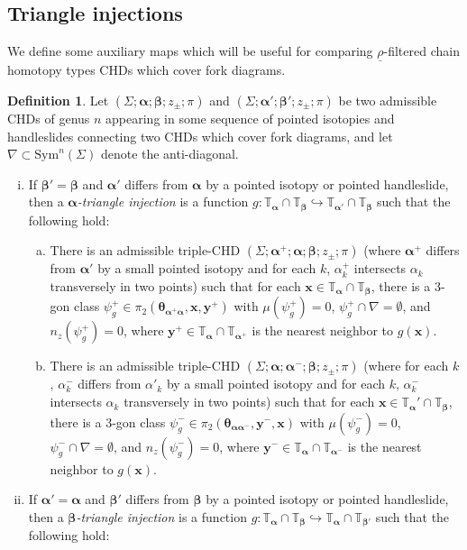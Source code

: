 \documentclass[11pt]{article}
\theoremstyle{plain} \newtheorem{thm}{Theorem}[subsection]
\theoremstyle{plain} \newtheorem{cor}[thm]{Corollary}
\theoremstyle{plain} \newtheorem{prop}[thm]{Proposition}
\theoremstyle{plain} \newtheorem{conj}[thm]{Conjecture}
\theoremstyle{plain} \newtheorem{lem}[thm]{Lemma}
\theoremstyle{definition} \newtheorem{df}[thm]{Definition}
\theoremstyle{remark} \newtheorem{rmk}[thm]{Remark}
\theoremstyle{remark} \newtheorem{obs}[thm]{Observation}
\newcommand{\red}[1]{\underline{#1}}
\newcommand{\ba}{\boldsymbol{\alpha}}
\newcommand{\bb}{\boldsymbol{\beta}}
\newcommand{\Ta}{\mathbb{T}_{\ba}}
\newcommand{\Tb}{\mathbb{T}_{\bb}}
\newcommand{\bx}{\mathbf{x}}
\newcommand{\by}{\mathbf{y}}
\newcommand{\thet}[1]{\boldsymbol{\theta}_{#1}}
\newcommand{\tor}[1]{\mathbb{T}_{#1}}
\newcommand{\AD}{\nabla}
\numberwithin{equation}{section}
\begin{document}
\subsection{Triangle injections}
We define some auxiliary maps which will be useful for comparing $\red{\rho}$-filtered chain homotopy types CHDs which cover fork diagrams.
\begin{df}\label{df:trimap}
Let $\left(\Sigma; \ba; \bb; z_{\pm}; \pi\right)$ and $\left(\Sigma; \ba'; \bb';z_{\pm}; \pi \right)$ be two admissible CHDs of genus $n$ appearing in some sequence of pointed isotopies and handleslides connecting two CHDs which cover fork diagrams, and let $\AD \subset \text{Sym}^n(\Sigma)$ denote the anti-diagonal.
\begin{enumerate}[(i)]
\item If $\bb' = \bb$ and $\ba'$ differs from $\ba$ by a pointed isotopy or pointed handleslide, then a $\ba$\textit{-triangle injection} is a function $g: \Ta \cap \Tb \hookrightarrow \tor{\ba'} \cap \Tb$ such that the following hold:
\begin{enumerate}[(a)]
\item There is an admissible triple-CHD $\left(\Sigma; \ba^{+}; \ba; \bb; z_{\pm}; \pi\right)$ (where $\ba^+$ differs from $\ba'$ by a small pointed isotopy and for each $k$, $\alpha^{+}_k$ intersects $\alpha_k$ transversely in two points) such that for each $\bx \in \Ta \cap \Tb$, there is a 3-gon class $\psi_{g}^{+} \in \pi_{2}(\thet{\ba^{+}\ba}, \bx, \by^{+})$ with $\mu(\psi_{g}^{+}) = 0$, $\psi_{g}^{+} \cap \AD = \emptyset$, and $n_{z}(\psi_{g}^{+}) = 0$, where $\by^{+} \in \Ta \cap \tor{\ba^{+}}$ is the nearest neighbor to $g(\bx)$.
\item There is an admissible triple-CHD $\left(\Sigma; \ba; \ba^{-}; \bb; z_{\pm}; \pi\right)$ (where for each $k$, $\alpha_{k}^{-}$ differs from $\alpha'_{k}$ by a small pointed isotopy and for each $k$, $\alpha^{-}_k$ intersects $\alpha_k$ transversely in two points)  such that for each $\bx \in \Ta' \cap \Tb$, there is a 3-gon class $\psi_{g}^{-} \in \pi_{2}(\thet{\ba\ba^{-}}, \by^{-}, \bx)$ with $\mu(\psi_{g}^{-}) = 0$, $\psi_{g}^{-} \cap \AD = \emptyset$, and $n_{z}(\psi_{g}^{-}) = 0$, where $\by^{-} \in \Ta \cap \tor{\ba^{-}}$ is the nearest neighbor to $g(\bx)$.
\end{enumerate}
\item If $\ba' = \ba$ and $\bb'$ differs from $\bb$ by a pointed isotopy or pointed handleslide, then a $\bb$\textit{-triangle injection} is a function $g: \Ta \cap \Tb \hookrightarrow \Ta \cap \tor{\bb'}$ such that the following hold:

\end{enumerate}
\end{df}
\end{document}
